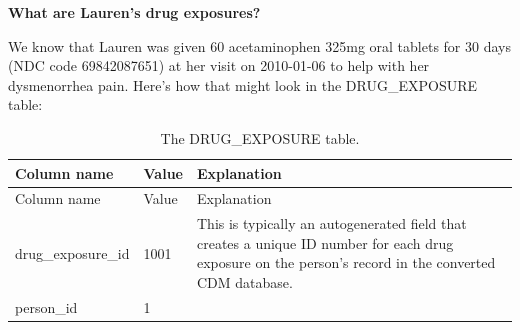 \documentclass[11pt]{book}
\begin{document}
\textbf{What are Lauren's drug exposures?}

We know that Lauren was given 60 acetaminophen 325mg oral tablets for 30
days (NDC code 69842087651) at her visit on 2010-01-06 to help with her
dysmenorrhea pain. Here's how that might look in the DRUG\_EXPOSURE
table:

\begin{longtable}[]{@{}lll@{}}
\caption{\label{tab:drugExposure} The DRUG\_EXPOSURE table.}\tabularnewline
\toprule
\begin{minipage}[b]{0.28\columnwidth}\raggedright\strut
Column name\strut
\end{minipage} & \begin{minipage}[b]{0.16\columnwidth}\raggedright\strut
Value\strut
\end{minipage} & \begin{minipage}[b]{0.48\columnwidth}\raggedright\strut
Explanation\strut
\end{minipage}\tabularnewline
\midrule
\endfirsthead
\toprule
\begin{minipage}[b]{0.28\columnwidth}\raggedright\strut
Column name\strut
\end{minipage} & \begin{minipage}[b]{0.16\columnwidth}\raggedright\strut
Value\strut
\end{minipage} & \begin{minipage}[b]{0.48\columnwidth}\raggedright\strut
Explanation\strut
\end{minipage}\tabularnewline
\midrule
\endhead
\begin{minipage}[t]{0.28\columnwidth}\raggedright\strut
drug\_exposure\_id\strut
\end{minipage} & \begin{minipage}[t]{0.16\columnwidth}\raggedright\strut
1001\strut
\end{minipage} & \begin{minipage}[t]{0.48\columnwidth}\raggedright\strut
This is typically an autogenerated field that creates a unique ID number
for each drug exposure on the person's record in the converted CDM
database.\strut
\end{minipage}\tabularnewline
\begin{minipage}[t]{0.28\columnwidth}\raggedright\strut
person\_id\strut
\end{minipage} & \begin{minipage}[t]{0.16\columnwidth}\raggedright\strut
1\strut
\end{minipage} & \begin{minipage}[t]{0.48\columnwidth}\raggedright\strut

\end{minipage}
\end{longtable}
\end{document}
